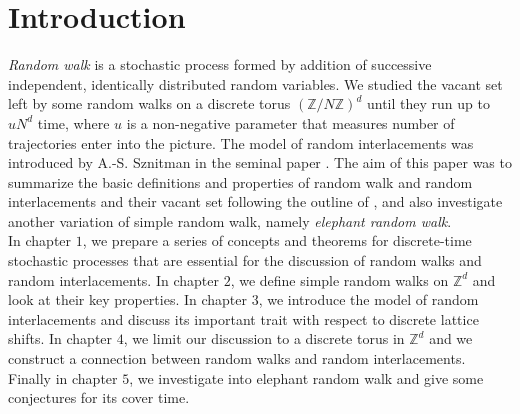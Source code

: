 \documentclass[
11pt, %
a4paper, %
oneside, %
headinclude,footinclude, %
BCOR5mm, %
]{scrartcl}
\begin{document}
\section{Introduction}
\textit{Random walk} is a stochastic process formed by addition of successive independent, identically distributed random variables. We studied the vacant set left by some random walks on a discrete torus $(\mathbb{Z}/N\mathbb{Z})^d$ until they run up to $uN^d$ time, where $u$ is a non-negative parameter that measures number of trajectories enter into the picture. The model of random interlacements was introduced by A.-S. Sznitman in the seminal paper \cite{sznitman2010vacant}. The aim of this paper was to summarize the basic definitions and properties of random walk and random interlacements and their vacant set following the outline of \cite{drewitz2014introduction}, and also investigate another variation of simple random walk, namely \textit{elephant random walk}.
\vspace{0.6em}\\In chapter $1$, we prepare a series of concepts and theorems for discrete-time stochastic processes that are essential for the discussion of random walks and random interlacements. In chapter $2$, we define simple random walks on $\mathbb{Z}^d$ and look at their key properties. In chapter $3$, we introduce the model of random interlacements and discuss its important trait with respect to discrete lattice shifts. In chapter $4$, we limit our discussion to a discrete torus in $\mathbb{Z}^d$ and we construct a connection between random walks and random interlacements. Finally in chapter $5$, we investigate into elephant random walk and give some conjectures for its cover time.
\end{document}
